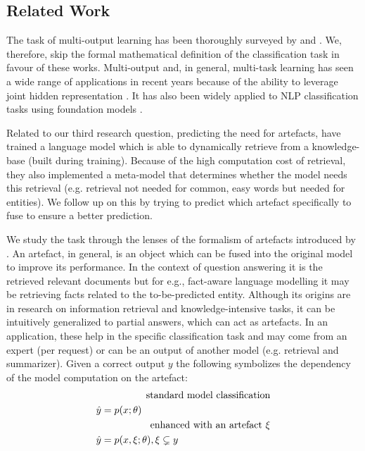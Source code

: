 \subsection{Related Work} \label{subsec:related}

The task of multi-output learning has been thoroughly surveyed by  and .
We, therefore, skip the formal mathematical definition of the classification task in favour of these works.
Multi-output and, in general, multi-task learning has seen a wide range of applications in recent years because of the ability to leverage joint hidden representation \cite{yao2020exploiting,proencca2020quadruplet}.
It has also been widely applied to NLP classification tasks using foundation models \cite{jiang2019multi,xin2020early,suhane2021multi}.

Related to our third research question, predicting the need for artefacts,  have trained a language model which is able to dynamically retrieve from a knowledge-base (built during training).
Because of the high computation cost of retrieval, they also implemented a meta-model that determines whether the model needs this retrieval (e.g. retrieval not needed for common, easy words but needed for entities).
We follow up on this by trying to predict which artefact specifically to fuse to ensure a better prediction.

We study the task through the lenses of the formalism of artefacts introduced by .
An artefact, in general, is an object which can be fused into the original model to improve its performance.
In the context of question answering it is the retrieved relevant documents but for e.g., fact-aware language modelling \cite{logan2019barack} it may be retrieving facts related to the to-be-predicted entity.
Although its origins are in research on information retrieval and knowledge-intensive tasks, it can be intuitively generalized to partial answers, which can act as artefacts.
In an application, these help in the specific classification task and may come from an expert (per request) or can be an output of another model (e.g. retrieval and summarizer).
Given a correct output $y$ the following symbolizes the dependency of the model computation on the artefact:
\begin{align*}
& & \hspace{-1.5cm} \text{standard model classification} \\
& \hat{y} = p(x;\theta) & \\
& & \hspace{-1.5cm} \text{enhanced with an artefact $\xi$} \\
& \hat{y} = p(x, \xi;\theta), \xi \subsetneq y
\end{align*}

